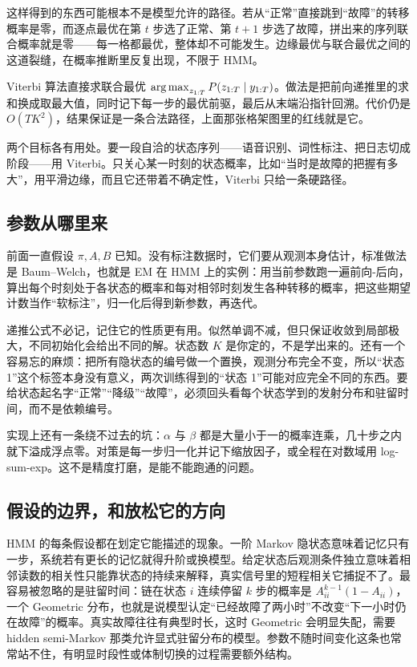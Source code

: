 这样得到的东西可能根本不是模型允许的路径。若从``正常''直接跳到``故障''的转移概率是零，而逐点最优在第 \(t\) 步选了正常、第 \(t+1\) 步选了故障，拼出来的序列联合概率就是零——每一格都最优，整体却不可能发生。边缘最优与联合最优之间的这道裂缝，在概率推断里反复出现，不限于 HMM。

Viterbi 算法直接求联合最优 \(\operatorname*{arg\,max}_{z_{1:T}}P(z_{1:T}\mid y_{1:T})\)。做法是把前向递推里的求和换成取最大值，同时记下每一步的最优前驱，最后从末端沿指针回溯。代价仍是 \(O(TK^2)\)，结果保证是一条合法路径，上面那张格架图里的红线就是它。

两个目标各有用处。要一段自洽的状态序列——语音识别、词性标注、把日志切成阶段——用 Viterbi。只关心某一时刻的状态概率，比如``当时是故障的把握有多大''，用平滑边缘，而且它还带着不确定性，Viterbi 只给一条硬路径。

\subsection{参数从哪里来}

前面一直假设 \(\pi,A,B\) 已知。没有标注数据时，它们要从观测本身估计，标准做法是 Baum--Welch，也就是 EM 在 HMM 上的实例：用当前参数跑一遍前向-后向，算出每个时刻处于各状态的概率和每对相邻时刻发生各种转移的概率，把这些期望计数当作``软标注''，归一化后得到新参数，再迭代。

递推公式不必记，记住它的性质更有用。似然单调不减，但只保证收敛到局部极大，不同初始化会给出不同的解。状态数 \(K\) 是你定的，不是学出来的。还有一个容易忘的麻烦：把所有隐状态的编号做一个置换，观测分布完全不变，所以``状态 1''这个标签本身没有意义，两次训练得到的``状态 1''可能对应完全不同的东西。要给状态起名字``正常''``降级''``故障''，必须回头看每个状态学到的发射分布和驻留时间，而不是依赖编号。

实现上还有一条绕不过去的坑：\(\alpha\) 与 \(\beta\) 都是大量小于一的概率连乘，几十步之内就下溢成浮点零。对策是每一步归一化并记下缩放因子，或全程在对数域用 log-sum-exp。这不是精度打磨，是能不能跑通的问题。

\subsection{假设的边界，和放松它的方向}

HMM 的每条假设都在划定它能描述的现象。一阶 Markov 隐状态意味着记忆只有一步，系统若有更长的记忆就得升阶或换模型。给定状态后观测条件独立意味着相邻读数的相关性只能靠状态的持续来解释，真实信号里的短程相关它捕捉不了。最容易被忽略的是驻留时间：链在状态 \(i\) 连续停留 \(k\) 步的概率是 \(A_{ii}^{k-1}(1-A_{ii})\)，一个 Geometric 分布，也就是说模型认定``已经故障了两小时''不改变``下一小时仍在故障''的概率。真实故障往往有典型时长，这时 Geometric 会明显失配，需要 hidden semi-Markov 那类允许显式驻留分布的模型。参数不随时间变化这条也常常站不住，有明显时段性或体制切换的过程需要额外结构。


